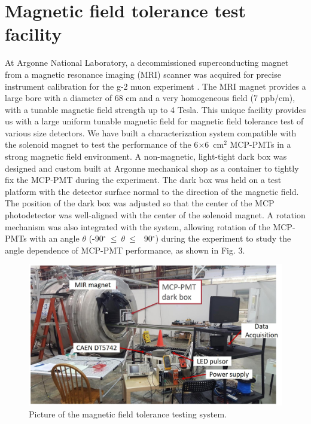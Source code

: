 \documentclass[preprint,5p]{elsarticle}
\begin{document}
\section{Magnetic field tolerance test facility} \label{sc}
At Argonne National Laboratory, a decommissioned superconducting magnet from a 
magnetic resonance imaging (MRI) scanner was acquired for precise instrument 
calibration for the g-2 muon experiment \cite{18}. The MRI magnet provides a 
large bore with a diameter of 68 cm and a very homogeneous field (7 ppb/cm), 
with a tunable magnetic field strength up to 4 Tesla. This unique facility 
provides us with a large uniform tunable magnetic field for magnetic field 
tolerance test of various size detectors. We have built a characterization 
system compatible with the solenoid magnet to test the performance of the 
6$\times$6~cm$^2$ MCP-PMTs in a strong magnetic field environment. A 
non-magnetic, light-tight dark box was designed and custom built at Argonne 
mechanical shop as a container to tightly fix the MCP-PMT during the 
experiment. The dark box was held on a test platform with the detector surface 
normal to the direction of the magnetic field. The position of the dark box was 
adjusted so that the center of the MCP photodetector was well-aligned with the 
center of the solenoid magnet. A rotation mechanism was also integrated with 
the system, allowing rotation of the MCP-PMTs with an angle $\theta$ 
(-90$^{\circ}~\leq~\theta~\leq~$~90$^{\circ}$) during the experiment to study 
the angle dependence of MCP-PMT performance, as shown in Fig. 3.

\begin{figure}[tbp]
\centering \includegraphics[scale=0.4]{fig/OYqCuD.jpg}
\caption{Picture of the magnetic field tolerance testing system.} 
   \label{fig:design}
\end{figure}
\end{document}
